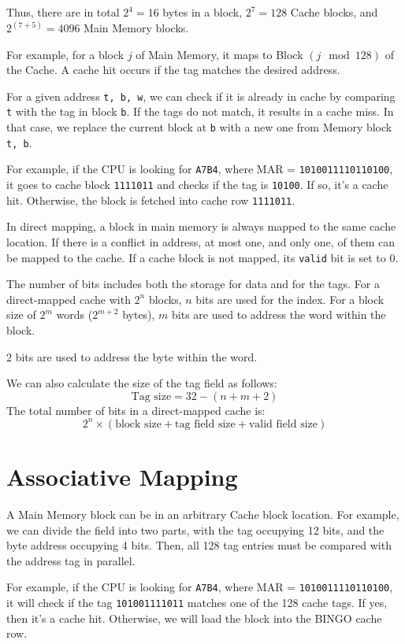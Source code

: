 Thus, there are in total \(2^4 = 16\) bytes in a block, \(2^7 = 128\) Cache blocks, and \(2^{(7 + 5)} = 4096\) Main Memory blocks.

For example, for a block \(j\) of Main Memory, it maps to Block \((j \mod 128)\) of the Cache. A cache hit occurs if the tag matches the desired address. 

For a given address \verb|t, b, w|, we can check if it is already in cache by comparing \verb|t| with the tag in block \verb|b|. If the tags do not match, it results in a cache miss. In that case, we replace the current block at \verb|b| with a new one from Memory block \verb|t, b|.

For example, if the CPU is looking for \verb|A7B4|, where MAR = \verb|1010011110110100|, it goes to cache block \verb|1111011| and checks if the tag is \verb|10100|. If so, it's a cache hit. Otherwise, the block is fetched into cache row \verb|1111011|.

In direct mapping, a block in main memory is always mapped to the same cache location. If there is a conflict in address, at most one, and only one, of them can be mapped to the cache. If a cache block is not mapped, its \texttt{valid} bit is set to 0.

The number of bits includes both the storage for data and for the tags. For a direct-mapped cache with \(2^n\) blocks, \(n\) bits are used for the index. For a block size of \(2^m\) words (\(2^{m+2}\) bytes), \(m\) bits are used to address the word within the block.

2 bits are used to address the byte within the word.

We can also calculate the size of the tag field as follows:
\[
  \text{Tag size} = 32 - (n + m + 2)
\]
The total number of bits in a direct-mapped cache is:
\[
  2^n \times (\text{block size} + \text{tag field size} + \text{valid field size})
\]

\section{Associative Mapping}
A Main Memory block can be in an arbitrary Cache block location. For example, we can divide the field into two parts, with the tag occupying 12 bits, and the byte address occupying 4 bits. Then, all 128 tag entries must be compared with the address tag in parallel.

For example, if the CPU is looking for \verb|A7B4|, where MAR = \verb|1010011110110100|, it will check if the tag \verb|101001111011| matches one of the 128 cache tags. If yes, then it's a cache hit. Otherwise, we will load the block into the BINGO cache row.

